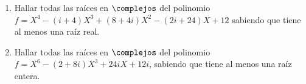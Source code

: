 \begin{enunciado}{\ejercicio}
	\begin{enumerate}[label=\roman*)]
		\item Hallar todas las raíces en $\complejos$ del polinomio $f = X^4 - (i + 4)X^3 + (8 + 4i)X^2 - (2i + 24)X + 12$
		      sabiendo que tiene al menos una raíz real.
		\item Hallar todas las raíces en $\complejos$ del polinomio $f = X^6 - (2 + 8i)X^3 + 24iX + 12i$,
		      sabiendo que tiene al menos una raíz entera.
	\end{enumerate}
\end{enunciado}
\hacer
